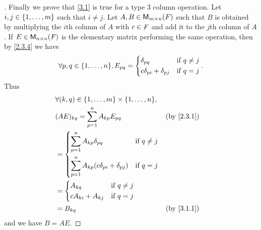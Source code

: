 \begin{proof}[]
  Finally we prove that \cref{3.1} is true for a type 3 column operation.
  Let \(i, j \in \left\lbrace1, \dots, m\right\rbrace\) such that \(i \neq j\).
  Let \(A, B \in \mathsf{M}_{{m} \times n}({\mathit{F}})\) such that \(B\) is obtained by multiplying the \(i\)th column of \(A\) with \(c \in \mathit{F}\) and add it to the \(j\)th column of \(A\).
  If \(E \in \mathsf{M}_{{n} \times n}({\mathit{F}})\) is the elementary matrix performing the same operation, then by \cref{2.3.4} we have
  \[
    \forall p, q \in \set{1, \dots, n}, E_{p q} = \begin{dcases}
      \delta_{p q}                  & \text{if } q \neq j \\
      c \delta_{p i} + \delta_{p j} & \text{if } q = j
    \end{dcases}.
  \]
  Thus
  \begin{align*}
     & \forall (k, q) \in \set{1, \dots, m} \times \set{1, \dots, n},                                                \\
     & (AE)_{k q} = \sum_{p = 1}^n A_{k p} E_{p q}                                     &  & \text{(by \cref{2.3.1})} \\
     & = \begin{dcases}
           \sum_{p = 1}^n A_{k p} \delta_{p q}                    & \text{if } q \neq j \\
           \sum_{p = 1}^n A_{k p} (c \delta_{p i} + \delta_{p j}) & \text{if } q = j
         \end{dcases}                                \\
     & = \begin{dcases}
           A_{k q}             & \text{if } q \neq j \\
           c A_{k i} + A_{k j} & \text{if } q = j
         \end{dcases}                                                                   \\
     & = B_{k q}                                                                       &  & \text{(by \cref{3.1.1})}
  \end{align*}
  and we have \(B = AE\).
\end{proof}

\exercisesection

